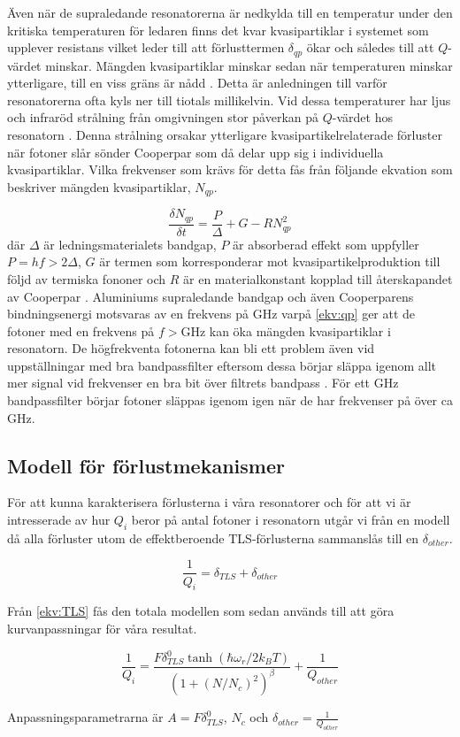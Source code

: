 \documentclass[main.tex]{subfiles}
\begin{document}
Även när de supraledande resonatorerna är nedkylda till en temperatur under den kritiska temperaturen för ledaren finns det kvar kvasipartiklar i systemet som upplever resistans vilket leder till att förlusttermen $\delta_{qp}$ ökar och således till att $Q$-värdet minskar. Mängden kvasipartiklar minskar sedan när temperaturen minskar ytterligare, till en viss gräns är nådd \cite{Barends2011}. Detta är anledningen till varför resonatorerna ofta kyls ner till tiotals millikelvin. Vid dessa temperaturer har ljus och infraröd strålning från omgivningen stor påverkan på $Q$-värdet hos resonatorn \cite{Barends2011}. Denna strålning orsakar ytterligare kvasipartikelrelaterade förluster när fotoner slår sönder Cooperpar som då delar upp sig i individuella kvasipartiklar. Vilka frekvenser som krävs för detta fås från följande ekvation som beskriver mängden kvasipartiklar, $N_{qp}$.

\begin{equation}
\label{ekv:qp}
    \frac{\delta N_{qp}}{\delta t}=\frac{P}{\Delta}+G-RN_{qp}^2
\end{equation}
där $\Delta$ är ledningsmaterialets bandgap, $P$ är absorberad effekt som uppfyller $P=hf>2\Delta$, $G$ är termen som korresponderar mot kvasipartikelproduktion till följd av termiska fononer och $R$ är en materialkonstant kopplad till återskapandet av Cooperpar \cite{Barends2011}. Aluminiums supraledande bandgap och även Cooperparens bindningsenergi motsvaras av en frekvens på \unit[88]{GHz} varpå \eqref{ekv:qp} ger att de fotoner med en frekvens på $f>$\unit[88]{GHz} kan öka mängden kvasipartiklar i resonatorn.
De högfrekventa fotonerna kan bli ett problem även vid uppställningar med bra bandpassfilter eftersom dessa börjar släppa igenom allt mer signal vid frekvenser en bra bit över filtrets bandpass \cite{santavicca2008}. För ett \unit[4-8]{GHz} bandpassfilter börjar fotoner släppas igenom igen när de har frekvenser på över ca \unit[20]{GHz}.

\subsection{Modell för förlustmekanismer}
För att kunna karakterisera förlusterna i våra resonatorer och för att vi är intresserade av hur $Q_i$ beror på antal fotoner i resonatorn utgår vi från en modell då alla förluster utom de effektberoende TLS-förlusterna sammanslås till en $\delta_{other}$.

\begin{equation*}
    \frac{1}{Q_i}=\delta_{TLS}+\delta_{other}
\end{equation*}
\noindent

Från \ref{ekv:TLS} fås den totala modellen som sedan används till att göra kurvanpassningar för våra resultat.

\begin{equation}
    \label{ekv:TLSmodel}
    \frac{1}{Q_i}=\frac{F\delta_{TLS}^0\tanh{(\hbar\omega_r/2k_BT)}}{(1+(N/N_c)^2)^\beta}+\frac{1}{Q_{other}}
\end{equation}

Anpassningsparametrarna är $A=F\delta_{TLS}^0$, $N_c$ och $\delta_{other}=\frac{1}{Q_{other}}$
\end{document}
